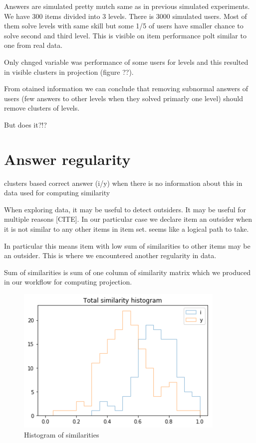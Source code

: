 \documentclass[
  digital, %
  table,   %
  nolof,     %
  nolot,     %
  nocover
]{fithesis3}
\begin{document}
Answers are simulated pretty mutch same as in previous simulated
experiments. We have 300 items divided into 3 levels. There is 3000
simulated users. Most of them solve levels with same skill but some 1/5
of users have smaller chance to solve second and third level. This is
visible on item performance polt similar to one from real data.

Only chnged variable was performance of some users for levels and this
resulted in visible clusters in projection (figure ??).

From otained information we can conclude that removing subnormal answers
of users (few answers to other levels when they solved primarly one
level) should remove clusters of levels.

But does it?!?

\section{Answer regularity}\label{answer-regularity}

clusters based correct answer (i/y) when there is no information about
this in data used for computing similarity


When exploring data, it may be useful to detect outsiders. It may be
useful for multiple reasons [CITE]. In our particular case we
declare item an outsider when it is not similar to any other items in
item set. seems like a logical path to take.

In particular this means item with low sum of similarities to other
items may be an outsider. This is where we encountered another
regularity in data.


Sum of similarities is sum of one column of similarity matrix which we
produced in our workflow for computing projection.

\begin{figure}
  \includegraphics[width=10cm]{img/histogram_i_y}
  \caption{Histogram of similarities}
  \label{fig:histogram_i_y}
\end{figure}
\end{document}
